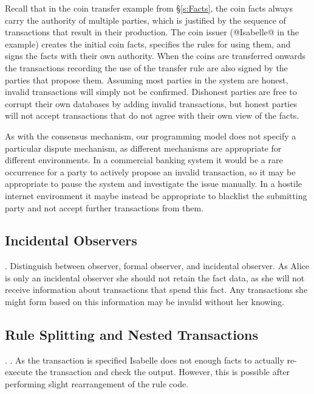  Recall that in the coin transfer example from \S\ref{s:Facts}, the coin facts always carry the authority of multiple parties, which is justified by the sequence of transactions that result in their production. The coin issuer (@Isabelle@ in the example) creates the initial coin facts, specifies the rules for using them, and signs the facts with their own authority. When the coins are transferred onwards the transactions recording the use of the transfer rule are also signed by the parties that propose them. Assuming most parties in the system are honest, invalid transactions will simply not be confirmed. Dishonest parties are free to corrupt their own databases by adding invalid transactions, but honest parties will not accept transactions that do not agree with their own view of the facts.

 As with the consensus mechanism, our programming model does not specify a particular dispute mechanism, as different mechanisms are appropriate for different environments. In a commercial banking system it would be a rare occurrence for a party to actively propose an invalid transaction, so it may be appropriate to pause the system and investigate the issue manually. In a hostile internet environment it maybe instead be appropriate to blacklist the submitting party and not accept further transactions from them.


\subsection{Incidental Observers}

. Distinguish between observer, formal observer, and incidental observer. As Alice is only an incidental observer she should not retain the fact data, as she will not receive information about transactions that spend this fact. Any transactions she might form based on this information may be invalid without her knowing.


\subsection{Rule Splitting and Nested Transactions}
. . As the transaction is specified Isabelle does not enough facts to actually re-execute the transaction and check the output. However, this is possible after performing slight rearrangement of the rule code.



